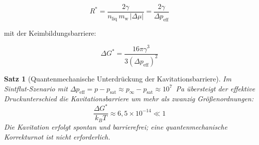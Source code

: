 ﻿\documentclass[12pt,a4paper]{report}
\newtheorem{theorem}{Satz}[chapter]
\begin{document}
\begin{equation}
	R^* = \frac{2\gamma}{n_\mathrm{liq}\,m_\mathrm{w}\,|\Delta\mu|} = \frac{2\gamma}{\Delta p_\mathrm{eff}}
	\label{eq:kritischer_radius}
\end{equation}

mit der Keimbildungsbarriere:

\begin{equation}
	\Delta G^* = \frac{16\pi\gamma^3}{3(\Delta p_\mathrm{eff})^2}
	\label{eq:keimbarriere}
	\end{equation}
		
\begin{theorem}[Quantenmechanische Unterdrückung der Kavitationsbarriere]
	\label{thm:kavitation_quanten}
	Im Sintflut-Szenario mit $\Delta p_\mathrm{eff} = p - p_\mathrm{sat} \approx p_\infty - p_\mathrm{sat} \approx 10^7$~Pa übersteigt der effektive Druckunterschied die Kavitationsbarriere um mehr als zwanzig Größenordnungen:
	\begin{equation}
		\frac{\Delta G^*}{k_BT} \approx 6{,}5\times10^{-14} \ll 1
		\label{eq:barrierebreite}
	\end{equation}
	Die Kavitation erfolgt spontan und barrierefrei; eine quantenmechanische Korrekturnot ist nicht erforderlich.
\end{theorem}
\end{document}
